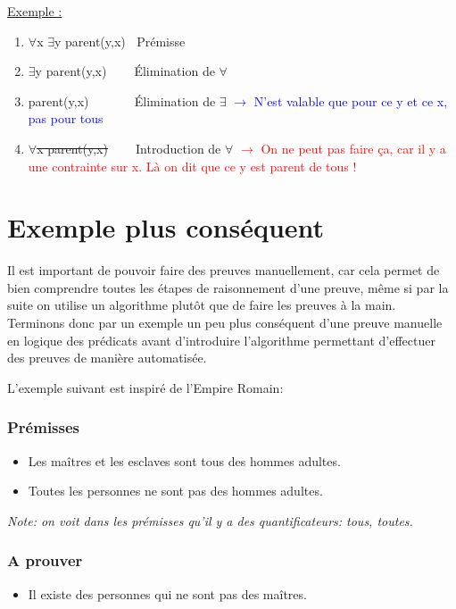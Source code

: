 \begin{flushleft}
\underline{Exemple :}\\
\begin{enumerate}
\item $\forall$x $\exists$y parent(y,x) $\>$ Prémisse
\item $\exists$y parent(y,x) $\>$ $\>$ $\>$ $\>$Élimination de $\forall$
\item parent(y,x) $\>$ $\>$ $\>$ $\>$ $\>$ $\>$ Élimination de $\exists$ \textcolor{blue}{$\rightarrow$ N'est valable que pour ce y et ce x, pas pour tous}
\item \sout{$\forall$x parent(y,x)} $\>$ $\>$ $\>$ $\>$Introduction de $\forall$ \textcolor{red}{$\rightarrow$ On ne peut pas faire ça, car il y a une contrainte sur x. Là on dit que ce y est parent de tous !}
\end{enumerate}




\end{flushleft}


\section{Exemple plus conséquent}

Il est important de pouvoir faire des preuves manuellement, car cela permet de bien comprendre toutes les étapes de raisonnement
d'une preuve, même si par la suite on utilise un algorithme plutôt que de faire les preuves à la main. 
Terminons donc par un exemple un peu plus conséquent d'une preuve manuelle en logique des prédicats avant d'introduire
l'algorithme permettant d'effectuer des preuves de manière automatisée.

L'exemple suivant est inspiré de l'Empire Romain: 
\subsubsection{Prémisses}
\begin{itemize}
    \item Les maîtres et les esclaves sont tous des hommes adultes.
    \item Toutes les personnes ne sont pas des hommes adultes.
\end{itemize}
\textit{Note: on voit dans les prémisses qu'il y a des quantificateurs: tous, toutes.}

\subsubsection{A prouver} 
\begin{itemize}
    \item Il existe des personnes qui ne sont pas des maîtres.
\end{itemize}

